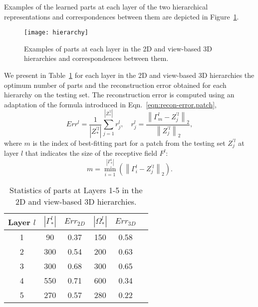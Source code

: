 \documentclass[conference]{IEEEtran}
\begin{document}
Examples of the learned parts at each layer of the two hierarchical representations and correspondences between them are depicted in Figure~\ref{hierarchy}.

\begin{figure}
\begin{center}
\texttt{[image: hierarchy]}
\end{center}
\caption{Examples of parts at each layer in the 2D and view-based 3D hierarchies and correspondences between them.}
\label{hierarchy}
\end{figure}

We present in Table~\ref{tab:stats} for each layer in the 2D and view-based 3D hierarchies the optimum number of parts and the reconstruction error obtained for each hierarchy on the testing set. The reconstruction error is computed using an adaptation of the formula introduced in Eqn.~\ref{eqn:recon-error.patch},
\begin{equation}
 Err^l = \frac{1}{|Z_*^{'l}|} \sum_{j=1}^{|Z_*^{'l}|} r_j^l,\quad
 r_j^l = \frac{\left\|\Gamma_m^l-Z_j^{'l}\right\|_2}{\left\|Z_j^{'l}\right\|_2},
 \label{eq:r}
\end{equation}
where $m$ is the index of best-fitting part for a patch from the testing set $Z_j^{'l}$ at layer $l$ that indicates the size of the receptive field $F^l$:
 \begin{equation}
 m=\min_{i=1}^{|\Gamma_*^l|}(\left\|\Gamma_i^l-Z_j^{'l}\right\|_2).
\end{equation}

 \begin{table}
 \begin{center}
  \begin{tabular}{ | c | c | c | c | c |r |}
      \hline
      Layer $l$  & $|\Gamma_*^l|$ & $Err_{2D}$ &  $|\Omega_*^l|$ & $Err_{3D}$ \\ \hline
    1 &  90 & 0.37 & 150 & 0.58 \\ \hline
    2 &  300 & 0.54 & 200 & 0.63 \\ \hline
    3 &  300 & 0.68 & 300 & 0.65  \\ \hline 
    4 &  550 & 0.71 & 600 & 0.34  \\ \hline
    5 &  270 & 0.57 & 280 & 0.22 \\ \hline
  \end{tabular}
\end{center}
 \caption{Statistics of parts at Layers 1-5 in the 2D and view-based 3D hierarchies.}
 \label{tab:stats}
\end{table}
\end{document}
